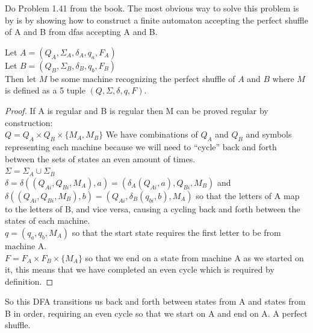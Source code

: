 \begin{problem}{3}
  Do Problem 1.41 from the book. The most obvious way to solve this problem is by is by showing how to construct a finite automaton accepting the perfect shuffle of A and B from dfas accepting A and B.

  \begin{solution}
    Let $A = (Q_A, \Sigma_A, \delta_A, q_a, F_A)$ \\
    Let $B = (Q_B, \Sigma_B, \delta_B, q_b, F_B)$ \\

    \noindent Then let $M$ be some machine recognizing the perfect shuffle of $A$ and $B$ where $M$ is defined as a
    5 tuple $(Q, \Sigma, \delta, q, F)$. \\

    \begin{proof}
      If A is regular and B is regular then M can be proved regular by construction: \\

          \noindent $Q = Q_A \times Q_B \times \{ M_A, M_B \}$ We have combinations of $Q_A$ and $Q_B$ and symbols representing each machine
          because we will need to ``cycle'' back and forth between the sets of states an even amount of times. \\

          \noindent $\Sigma = \Sigma_A \cup \Sigma_B$ \\

          \noindent $\delta = \delta((Q_{Ai}, Q_{Bi}, M_A), a) = (\delta_A(Q_{Ai}, a), Q_{Bi}, M_B)$ and $\delta((Q_{Ai}, Q_{Bi}, M_B), b) = (Q_{Ai}, \delta_B(q_{bi}, b), M_A)$ so that the letters of A map to the letters of B, and vice versa, causing a cycling back and forth between the states of each machine. \\

          \noindent $q = (q_a, q_b, M_A)$ so that the start state requires the first letter to be from machine A. \\

          \noindent $F = F_A \times F_B \times \{ M_A \}$ so that we end on a state from machine A as we started on it, this means that we have completed an even cycle which is required by definition.
    \end{proof}

    \noindent So this DFA transitions us back and forth between states from A and states from B in order, requiring an
    even cycle so that we start on A and end on A. A perfect shuffle.
  \end{solution}
\end{problem} \newpage

